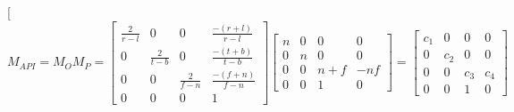 \documentclass[conference]{IEEEtran}
\begin{document}
\twocolumn[
    \begin{equation} \label{eqn:API_matrix}
        M_{API} = M_O M_P =
        \begin{bmatrix}
            \frac{2}{r - l} & 0               & 0               & \frac{-(r + l)}{r - l} \\
            0               & \frac{2}{t - b} & 0               & \frac{-(t + b)}{t - b} \\
            0               & 0               & \frac{2}{f - n} & \frac{-(f + n)}{f - n} \\
            0               & 0               & 0               & 1
        \end{bmatrix}
        \begin{bmatrix}
            n & 0 & 0     & 0   \\
            0 & n & 0     & 0   \\
            0 & 0 & n + f & -nf \\
            0 & 0 & 1     & 0
        \end{bmatrix}
        =
        \begin{bmatrix}
            c_1 & 0   & 0   & 0   \\
            0   & c_2 & 0   & 0   \\
            0   & 0   & c_3 & c_4 \\
            0   & 0   & 1   & 0
        \end{bmatrix}
    \end{equation}
\end{document}
